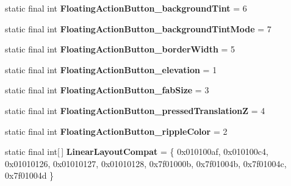 \begin{DoxyCompactItemize}
\item 
\hypertarget{classandroid_1_1support_1_1design_1_1_r_1_1styleable_a85f23456b7532cd6277a61b75950a347}{}static final int {\bfseries Floating\+Action\+Button\+\_\+background\+Tint} = 6\label{classandroid_1_1support_1_1design_1_1_r_1_1styleable_a85f23456b7532cd6277a61b75950a347}

\item 
\hypertarget{classandroid_1_1support_1_1design_1_1_r_1_1styleable_aec998f25022d4f6c553ba33ad00d1cb4}{}static final int {\bfseries Floating\+Action\+Button\+\_\+background\+Tint\+Mode} = 7\label{classandroid_1_1support_1_1design_1_1_r_1_1styleable_aec998f25022d4f6c553ba33ad00d1cb4}

\item 
\hypertarget{classandroid_1_1support_1_1design_1_1_r_1_1styleable_a4357081bb8fe8824282e54ef9f4ae3cc}{}static final int {\bfseries Floating\+Action\+Button\+\_\+border\+Width} = 5\label{classandroid_1_1support_1_1design_1_1_r_1_1styleable_a4357081bb8fe8824282e54ef9f4ae3cc}

\item 
\hypertarget{classandroid_1_1support_1_1design_1_1_r_1_1styleable_a52c86e4b7032178a47c2a0509d3dfa7d}{}static final int {\bfseries Floating\+Action\+Button\+\_\+elevation} = 1\label{classandroid_1_1support_1_1design_1_1_r_1_1styleable_a52c86e4b7032178a47c2a0509d3dfa7d}

\item 
\hypertarget{classandroid_1_1support_1_1design_1_1_r_1_1styleable_a6c9839a534ad6bc71d39c9655b6d8f91}{}static final int {\bfseries Floating\+Action\+Button\+\_\+fab\+Size} = 3\label{classandroid_1_1support_1_1design_1_1_r_1_1styleable_a6c9839a534ad6bc71d39c9655b6d8f91}

\item 
\hypertarget{classandroid_1_1support_1_1design_1_1_r_1_1styleable_a0051f7f3dbf011baf338d3a1da28adb9}{}static final int {\bfseries Floating\+Action\+Button\+\_\+pressed\+Translation\+Z} = 4\label{classandroid_1_1support_1_1design_1_1_r_1_1styleable_a0051f7f3dbf011baf338d3a1da28adb9}

\item 
\hypertarget{classandroid_1_1support_1_1design_1_1_r_1_1styleable_a321eed9129c57174a965ba1530752167}{}static final int {\bfseries Floating\+Action\+Button\+\_\+ripple\+Color} = 2\label{classandroid_1_1support_1_1design_1_1_r_1_1styleable_a321eed9129c57174a965ba1530752167}

\item 
\hypertarget{classandroid_1_1support_1_1design_1_1_r_1_1styleable_a00b7e2da5bc1f659d80ac76716119713}{}static final int\mbox{[}$\,$\mbox{]} {\bfseries Linear\+Layout\+Compat} = \{ 0x010100af, 0x010100c4, 0x01010126, 0x01010127, 0x01010128, 0x7f01000b, 0x7f01004b, 0x7f01004c, 0x7f01004d \}\label{classandroid_1_1support_1_1design_1_1_r_1_1styleable_a00b7e2da5bc1f659d80ac76716119713}


\end{DoxyCompactItemize}
